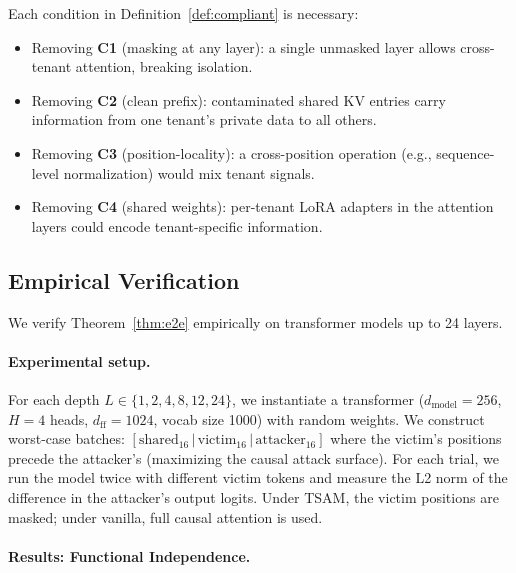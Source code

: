 \begin{remark}
\label{rem:tightness}
Each condition in Definition~\ref{def:compliant} is necessary:
\begin{itemize}[leftmargin=1.5em]
    \item Removing \textbf{C1} (masking at any layer): a single unmasked layer allows
          cross-tenant attention, breaking isolation.
    \item Removing \textbf{C2} (clean prefix): contaminated shared KV entries carry
          information from one tenant's private data to all others.
    \item Removing \textbf{C3} (position-locality): a cross-position operation (e.g.,
          sequence-level normalization) would mix tenant signals.
    \item Removing \textbf{C4} (shared weights): per-tenant LoRA adapters in the
          attention layers could encode tenant-specific information.
\end{itemize}
\end{remark}

\subsection{Empirical Verification}
\label{sec:e2e:empirical}

We verify Theorem~\ref{thm:e2e} empirically on transformer models up to 24 layers.

\paragraph{Experimental setup.}
For each depth $L \in \{1, 2, 4, 8, 12, 24\}$, we instantiate a transformer
($d_{\mathrm{model}} = 256$, $H = 4$ heads, $d_{\mathrm{ff}} = 1024$,
vocab size 1000) with random weights.  We construct worst-case batches:
$[\text{shared}_{16}\,|\,\text{victim}_{16}\,|\,\text{attacker}_{16}]$
where the victim's positions precede the attacker's (maximizing the causal
attack surface).  For each trial, we run the model twice with different
victim tokens and measure the L2 norm of the difference in the attacker's
output logits.  Under TSAM, the victim positions are masked; under vanilla,
full causal attention is used.

\paragraph{Results: Functional Independence.}

